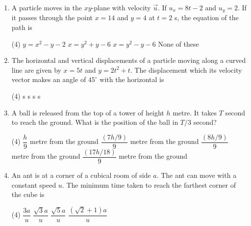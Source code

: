\documentclass{article}
\renewcommand{\frac}[2]{\dfrac{#1}{#2}}
\begin{document}
\begin{enumerate}
    \item A particle moves in the \( xy \)-plane with velocity \( \vec{u} \). If \( u_x = 8t - 2 \) and \( u_y = 2 \). If it passes through the point \( x = 14 \) and \( y = 4 \) at \( t = 2 \) s, the equation of the path is
    \begin{tasks}(4)
        \task \( y = x^2 - y - 2 \)
        \task \( x = y^2 + y - 6 \)
        \task \( x = y^2 - y - 6 \)
        \task None of these
    \end{tasks}
    \item The horizontal and vertical displacements of a particle moving along a curved line are given by \( x = 5t \) and \( y = 2t^2 + t \). The displacement which its velocity vector makes an angle of \( 45^\circ \) with the horizontal is
    \begin{tasks}(4)
         s
         s
         s
         s
    \end{tasks}
    \item A ball is released from the top of a tower of height \( h \) metre. It takes \( T \) second to reach the ground. What is the position of the ball in \( T/3 \) second?
    \begin{tasks}(4)
        \task \( \frac{h}{9} \) metre from the ground
        \task \( \frac{(7h/9)}{9} \) metre from the ground
        \task \( \frac{(8h/9)}{9} \) metre from the ground
        \task \( \frac{(17h/18)}{9} \) metre from the ground
    \end{tasks}
    \item An ant is at a corner of a cubical room of side \( a \). The ant can move with a constant speed \( u \). The minimum time taken to reach the farthest corner of the cube is
    \begin{tasks}(4)
        \task \( \frac{3a}{u} \)
        \task \( \frac{\sqrt{3}a}{u} \)
        \task \( \frac{\sqrt{5}a}{u} \)
        \task \( \frac{(\sqrt{2} + 1)a}{u} \)
    \end{tasks}


\end{enumerate}
\end{document}
